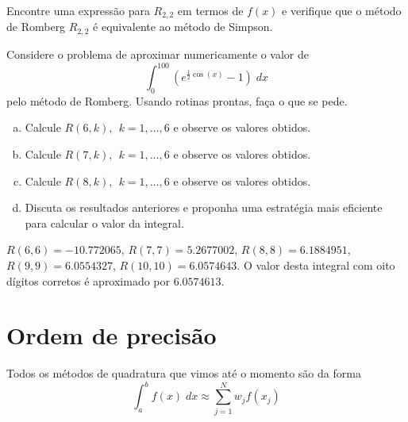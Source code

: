 \begin{exer}
Encontre uma expressão para $R_{2,2}$ em termos de $f(x)$ e verifique que o método de Romberg $R_{2,2}$ é equivalente ao método de Simpson.
\end{exer}

\begin{exer}
Considere o problema de aproximar numericamente o valor de
\begin{equation} \int_0^{100} \left(e^{\frac{1}{2}\cos(x)}-1\right)\;dx \end{equation}
pelo método de Romberg. Usando rotinas prontas, faça o que se pede.
\begin{enumerate}[a)]
\item Calcule $R(6,k),~~ k=1,\ldots,6$ e observe os valores obtidos.
\item Calcule $R(7,k),~~ k=1,\ldots,6$ e observe os valores obtidos.
\item Calcule $R(8,k),~~ k=1,\ldots,6$ e observe os valores obtidos.
\item Discuta os resultados anteriores e proponha uma estratégia mais eficiente para calcular o valor da integral.
\end{enumerate}
\end{exer}
\begin{resp}
  $R(6,6)=- 10.772065$, $R(7,7)=5.2677002$, $R(8,8)=6.1884951$, $R(9,9)=6.0554327$, $R(10,10)=6.0574643$. O valor desta integral com oito dígitos corretos é aproximado por  $6.0574613$.
\end{resp}

\section{Ordem de precisão}

Todos os métodos de quadratura que vimos até o momento são da forma
\begin{equation} \int_a^b f(x)\;dx \approx \sum_{j=1}^N w_j f(x_j) \end{equation}

